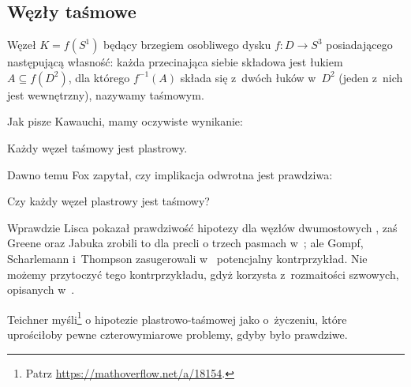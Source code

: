 
\subsection{Węzły taśmowe}
%
\begin{definition}
    Węzeł $K = f(S^1)$ będący brzegiem osobliwego dysku $f \colon D \to S^3$ posiadającego następującą własność: każda przecinająca siebie składowa jest łukiem $A \subseteq f(D^2)$, dla którego $f^{-1}(A)$ składa się z~dwóch łuków w~$D^2$ (jeden z~nich jest wewnętrzny), nazywamy taśmowym.
\end{definition}

Jak pisze Kawauchi, mamy oczywiste wynikanie:

\begin{proposition}
%
    Każdy węzeł taśmowy jest plastrowy.
\end{proposition}

Dawno temu Fox \cite[problem 1.33]{kirby78} zapytał, czy implikacja odwrotna jest prawdziwa:
%

\begin{conjecture}
    Czy każdy węzeł plastrowy jest taśmowy?
\end{conjecture}

Wprawdzie Lisca pokazał prawdziwość hipotezy dla węzłów dwumostowych \cite{lisca07},
%
%
zaś Greene oraz Jabuka zrobili to dla precli o trzech pasmach w~\cite{greene11};
%
%
%
ale Gompf, Scharlemann i~Thompson zasugerowali w~\cite{gompf10} potencjalny kontrprzykład.
%
%
%
%
Nie możemy przytoczyć tego kontrprzykładu, gdyż korzysta z~rozmaitości szwowych, opisanych w~\cite[s. 53-59]{kawauchi96}.

Teichner myśli\footnote{Patrz \url{https://mathoverflow.net/a/18154}.} o hipotezie plastrowo-taśmowej jako o~życzeniu, które uprościłoby pewne czterowymiarowe problemy, gdyby było prawdziwe.
%



